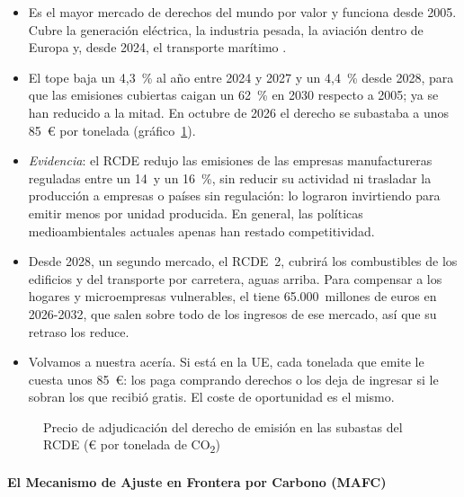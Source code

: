 \documentclass[11pt]{article}
\begin{document}
\begin{itemize}
\item Es el mayor mercado de derechos del mundo por valor y funciona desde 2005\nocite{UE2003Directiva87}. Cubre la generación eléctrica, la industria pesada, la aviación dentro de Europa y, desde 2024, el transporte marítimo .
\item El tope baja un 4,3~\% al año entre 2024 y 2027 y un 4,4~\% desde 2028\nocite{CE2025TopeETS}, para que las emisiones cubiertas caigan un 62~\% en 2030 respecto a 2005; ya se han reducido a la mitad\nocite{CE2026EmisionesETS2025}. En octubre de 2026 el derecho se subastaba a unos 85~€ por tonelada\nocite{EEX2026Subastas} (gráfico~\ref{fig:precio-rcde}).
\item \emph{Evidencia}: el RCDE redujo las emisiones de las empresas manufactureras reguladas entre un 14~y un 16~\%, sin reducir su actividad ni trasladar la producción a empresas o países sin regulación: lo lograron invirtiendo para emitir menos por unidad producida\nocite{Colmer2025Pricing}. En general, las políticas medioambientales actuales apenas han restado competitividad\nocite{DechezlepretreSato2017Impacts}.
\item Desde 2028, un segundo mercado, el RCDE~2, cubrirá los combustibles de los edificios y del transporte por carretera, aguas arriba\nocite{UE2026Reglamento667}. Para compensar a los hogares y microempresas vulnerables, el  tiene 65.000~millones de euros en 2026-2032, que salen sobre todo de los ingresos de ese mercado, así que su retraso los reduce\nocite{UE2023Reglamento955,CE2026FondoSocial}.
\item Volvamos a nuestra acería. Si está en la UE, cada tonelada que emite le cuesta unos 85~€: los paga comprando derechos o los deja de ingresar si le sobran los que recibió gratis. El coste de oportunidad es el mismo.
\end{itemize}

\begin{figure}[H]
\centering
\caption{Precio de adjudicación del derecho de emisión en las subastas del RCDE (€ por tonelada de CO\textsubscript{2})}\label{fig:precio-rcde}
\end{figure}

\paragraph{El Mecanismo de Ajuste en Frontera por Carbono (MAFC)}
\end{document}
